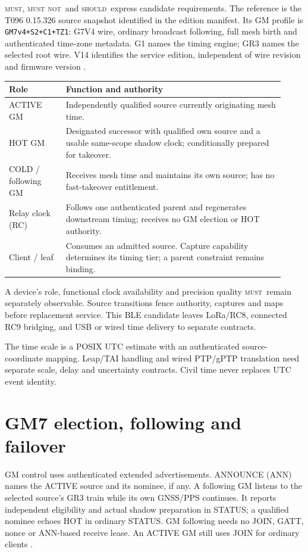 \documentclass[11pt,letterpaper]{article}
\newcommand{\must}{\textsc{must}}\newcommand{\mustnot}{\textsc{must not}}\newcommand{\should}{\textsc{should}}\newcommand{\code}[1]{\texttt{#1}}\newcommand{\page}{\clearpage}
\begin{document}
\must, \mustnot\ and \should\ express candidate requirements. The reference is the T096 0.15.326 source snapshot identified in the edition manifest. Its GM profile is \code{GM7v4+S2+C1+TZ1}: G7V4 wire, ordinary broadcast following, full mesh birth and authenticated time-zone metadata. G1 names the timing engine; GR3 names the selected root wire. V14 identifies the service edition, independent of wire revision and firmware version \cite{gm7,tz,wire}.
\begin{center}\small
\begin{tabular}{@{}L{0.19\linewidth}L{0.73\linewidth}@{}}\toprule
Role & Function and authority\\\midrule
ACTIVE GM & Independently qualified source currently originating mesh time.\\
HOT GM & Designated successor with qualified own source and a usable same-scope shadow clock; conditionally prepared for takeover.\\
COLD / following GM & Receives mesh time and maintains its own source; has no fast-takeover entitlement.\\
Relay clock (RC) & Follows one authenticated parent and regenerates downstream timing; receives no GM election or HOT authority.\\
Client / leaf & Consumes an admitted source. Capture capability determines its timing tier; a parent constraint remains binding.\\
\bottomrule\end{tabular}\end{center}
A device's role, functional clock availability and precision quality \must\ remain separately observable. Source transitions fence authority, captures and maps before replacement service. This BLE candidate leaves LoRa/RC8, connected RC9 bridging, and USB or wired time delivery to separate contracts.

The time scale is a POSIX UTC estimate with an authenticated source-coordinate mapping. Leap/TAI handling and wired PTP/gPTP translation need separate scale, delay and uncertainty contracts. Civil time never replaces UTC event identity.

\page
\section{GM7 election, following and failover}
GM control uses authenticated extended advertisements. ANNOUNCE (ANN) names the ACTIVE source and its nominee, if any. A following GM listens to the selected source's GR3 train while its own GNSS/PPS continues. It reports independent eligibility and actual shadow preparation in STATUS; a qualified nominee echoes HOT in ordinary STATUS. GM following needs no JOIN, GATT, nonce or ANN-based receive lease. An ACTIVE GM still uses JOIN for ordinary clients \cite{gm7}.
\end{document}
